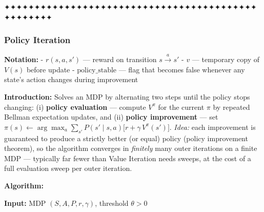 \documentclass[11pt]{article}
\begin{document}
    ✦✦✦✦✦✦✦✦✦✦✦✦✦✦✦✦✦✦✦✦✦✦✦✦✦✦✦✦✦✦✦✦✦✦✦✦✦✦✦✦✦✦✦✦✦✦✦✦✦✦

    \clearpage

\label{policy-iteration-algo}

    \subsubsection{Policy Iteration}\label{policy-iteration}

    \textbf{Notation:} - \(r(s,a,s')\) --- reward on transition
\(s \xrightarrow{a} s'\) - \(v\) --- temporary copy of \(V(s)\) before
update - \(\text{policy\_stable}\) --- flag that becomes false whenever
any state's action changes during improvement

    \label{intro-1-2}

    \textbf{Introduction:} Solves an MDP by alternating two steps until the
policy stops changing: (i) \textbf{policy evaluation} --- compute
\(V^\pi\) for the current \(\pi\) by repeated Bellman expectation
updates, and (ii) \textbf{policy improvement} --- set
\(\pi(s) \leftarrow \arg\max_a \sum_{s'} P(s'\mid s,a)\bigl[r + \gamma\, V^\pi(s')\bigr]\).
\emph{Idea:} each improvement is guaranteed to produce a strictly better
(or equal) policy (policy improvement theorem), so the algorithm
converges in \emph{finitely} many outer iterations on a finite MDP ---
typically far fewer than Value Iteration needs sweeps, at the cost of a
full evaluation sweep per outer iteration.

    \textbf{Algorithm:}

\textbf{Input:} MDP \((S, A, P, r, \gamma)\), threshold \(\theta > 0\)
\end{document}

